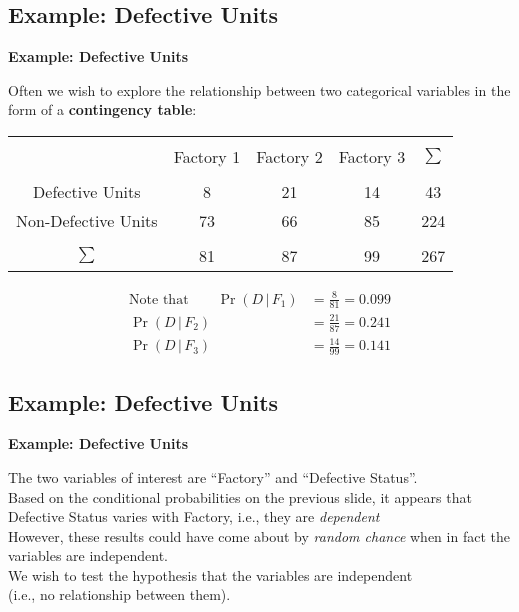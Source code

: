 \documentclass[compress]{beamer}        %
\makeatletter
\newcommand{\tcb}{\textcolor{beamer@blendedblue}}
\makeatother
\begin{document}
\subsection{Example: Defective Units}
\begin{frame}{\bf \tcb{Example: Defective Units}}

Often we wish to explore the relationship between two categorical variables in the form of a {\bf contingency table}:
\begin{center}
\begin{tabular}{|c|ccc|c|}
\hline
&&&&\\[-0.3cm]
                    & Factory 1 & Factory 2 & Factory 3 & $\sum$ \\[0.1cm]
\hline
&&&&\\[-0.3cm]
Defective Units     &  8        &  21       &  14       & 43 \\[0.2cm]
Non-Defective Units &  73       &  66       &  85       & 224 \\[0.1cm]
\hline
&&&&\\[-0.3cm]
$\sum$              &  81       &  87       &  99       & 267 \\[0.1cm]
\hline
\end{tabular}
\end{center}


\begin{align*}
\text{Note that} \qquad \Pr(D\,|\,F_1) &= \tfrac{8}{81} = 0.099\\[0.4cm]
\Pr(D\,|\,F_2) &= \tfrac{21}{87} = 0.241\\[0.4cm]
\Pr(D\,|\,F_3) &= \tfrac{14}{99} = 0.141
\end{align*}

\end{frame}


\subsection{Example: Defective Units}
\begin{frame}{\bf \tcb{Example: Defective Units}}

The two variables of interest are ``Factory'' and ``Defective Status''.\\[1cm]


Based on the conditional probabilities on the previous slide, it appears that Defective Status varies with Factory, i.e., they are \emph{dependent}\\[1cm]


However, these results could have come about by \emph{random chance} when in fact the variables are independent.\\[1cm]

We wish to test the hypothesis that the variables are independent\\ (i.e., no relationship between them).

\end{frame}
\end{document}
